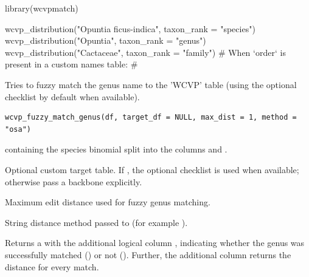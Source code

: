 \documentclass[a4paper]{book}
\begin{document}
%
\begin{Examples}
\begin{ExampleCode}


library(wcvpmatch)

wcvp_distribution("Opuntia ficus-indica", taxon_rank = "species")
wcvp_distribution("Opuntia", taxon_rank = "genus")
wcvp_distribution("Cactaceae", taxon_rank = "family")
# When `order` is present in a custom names table:
# 


\end{ExampleCode}
\end{Examples}
%
\begin{Description}
\strong{[Stable]}

Tries to fuzzy match the genus name to the 'WCVP' table (using the optional  checklist by default when available).
\end{Description}
%
\begin{Usage}
\begin{verbatim}
wcvp_fuzzy_match_genus(df, target_df = NULL, max_dist = 1, method = "osa")
\end{verbatim}
\end{Usage}
%
\begin{Arguments}
\begin{ldescription}
\item[\code{df}]  containing the species binomial split into the columns  and .

\item[\code{target\_df}] Optional custom target table. If , the optional  checklist is used when available; otherwise pass a backbone explicitly.

\item[\code{max\_dist}] Maximum edit distance used for fuzzy genus matching.

\item[\code{method}] String distance method passed to  (for example ).
\end{ldescription}
\end{Arguments}
%
\begin{Value}
Returns a  with the additional logical column , indicating whether the genus was successfully matched () or not ().
Further, the additional column  returns the distance for every match.
\end{Value}
\end{document}
